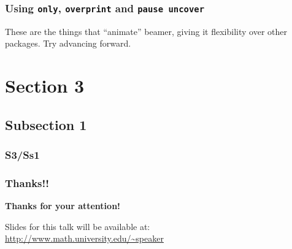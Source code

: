 \documentclass[notes]{beamer}
\begin{document}
\begin{frame}
\frametitle{Using {\tt only}, {\tt overprint} and {\tt pause uncover}}

These are the things that ``animate'' beamer, giving it flexibility over other packages.  Try advancing forward.

\pause{}

\pause{}



\end{frame}

\section{Section 3}

\subsection{Subsection 1}

\begin{frame}
\frametitle{S3/Ss1}
\end{frame}

\begin{frame}
\frametitle{Thanks!!}
\vskip20pt

\begin{center}
{\bf \color{alert} Thanks for your attention!}
\end{center}

\vskip20pt

\begin{center}
Slides for this talk will be available at:\\
\url{http://www.math.university.edu/~speaker}
\vskip12pt
\end{center}

\titlepage
\end{frame}
\end{document}
